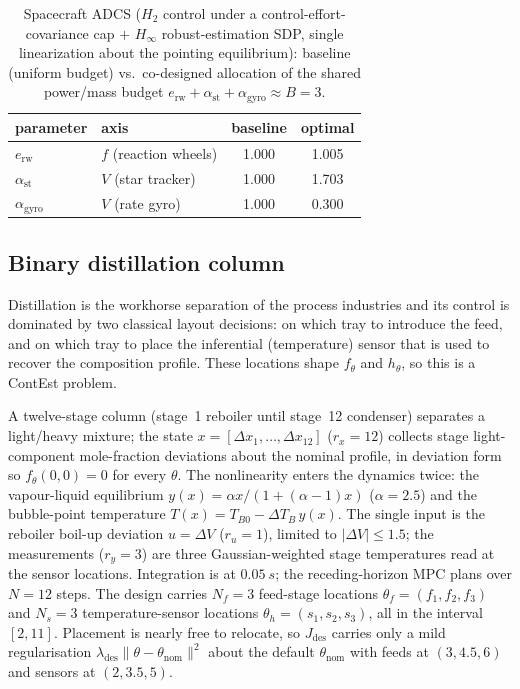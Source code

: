 \documentclass[twocolumn,amsthm]{autart}
\begin{document}
\begin{table}[t]
\centering
\caption{Spacecraft ADCS ($H_2$ control under a control-effort-covariance cap $+$
$H_\infty$ robust-estimation SDP, single
linearization about the pointing equilibrium): baseline (uniform budget) vs.\
co-designed allocation of the shared power/mass budget
$e_{\mathrm{rw}}+\alpha_{\mathrm{st}}+\alpha_{\mathrm{gyro}}\approx B=3$.}
\label{tab:adcs}
\begin{tabular}{llcc}
\hline
parameter & axis & baseline & optimal \\
\hline
$e_{\mathrm{rw}}$       & $f$ (reaction wheels) & 1.000 & 1.005 \\
$\alpha_{\mathrm{st}}$  & $V$ (star tracker)    & 1.000 & 1.703 \\
$\alpha_{\mathrm{gyro}}$& $V$ (rate gyro)       & 1.000 & 0.300 \\
\hline
\end{tabular}
\end{table}

\subsection{Binary distillation column}
\label{sec:sim:distill}

Distillation is the workhorse separation of the process
industries and its control is dominated by two classical layout decisions: on
which tray to introduce the feed, and on which tray to place the
inferential (temperature) sensor that is used to recover the composition
profile. These locations shape $f_\theta$ and $h_\theta$, so this is a ContEst problem.

A twelve-stage column (stage~1 reboiler
until stage~12 condenser) separates a light/heavy mixture; the state
$x=[\Delta x_1,\dots,\Delta x_{12}]$ ($r_x=12$) collects stage light-component
mole-fraction deviations about the nominal profile, in deviation form so
$f_\theta(0,0)=0$ for every $\theta$. The nonlinearity enters the dynamics twice: the vapour-liquid equilibrium
$y(x)=\alpha x/(1+(\alpha-1)x)$ ($\alpha=2.5$) and the bubble-point temperature
$T(x)=T_{B0}-\Delta T_B\,y(x)$. The single input is the reboiler boil-up
deviation $u=\Delta V$ ($r_u=1$), limited to $|\Delta V|\le1.5$; the measurements
($r_y=3$) are three Gaussian-weighted stage temperatures read at the sensor
locations. Integration is at $\SI{0.05}{s}$; the receding-horizon MPC plans over
$N=12$ steps. The design carries
$N_f=3$ feed-stage locations $\theta_f=(f_1,f_2,f_3)$ and $N_s=3$
temperature-sensor locations $\theta_h=(s_1,s_2,s_3)$, all in the interval $[2,11]$. Placement is nearly free to relocate,
so $J_{\mathrm{des}}$ carries only a mild regularisation
$\lambda_{\mathrm{des}}\lVert\theta-\theta_{\mathrm{nom}}\rVert^2$ about the
default $\theta_{\mathrm{nom}}$ with feeds at $(3,4.5,6)$ and sensors at
$(2,3.5,5)$.
\end{document}
